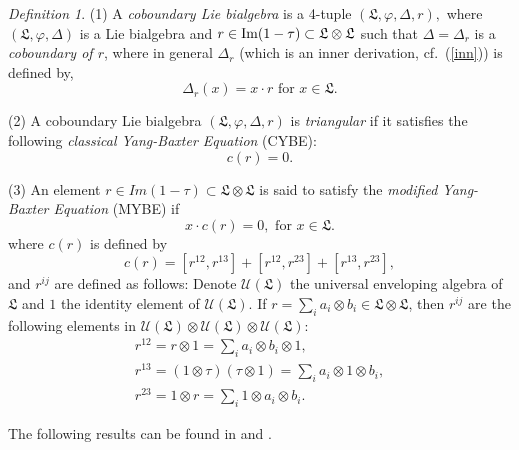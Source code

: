 \documentclass{amsart}
\theoremstyle{definition}
\theoremstyle{remark}
\numberwithin{equation}{subsection}
\numberwithin{equation}{section}
\newtheorem{defi}[theo]{Definition}
\begin{document}
\begin{defi}
\label{def2} \rm (1) A {\it coboundary Lie bialgebra} is a 4-tuple
$(\mathfrak{L} , {\varphi}, {\Delta},r),$ where $(\mathfrak{L}, {\varphi}, {\Delta})$ is a Lie
bialgebra and $r \in {{\rm Im}}(1 - \tau) \subset \mathfrak{L}  \otimes
\mathfrak{L} $ such that ${\Delta}={\Delta}_r$ is a {\it coboundary of $r$},
where in general ${\Delta}_r$ (which is an inner derivation,
cf.~(\ref{inn})) is defined by,
\begin{equation}
\label{D-r} {\Delta}_r (x) = x \cdot r \mbox{ \ \ for \ \ }x \in
\mathfrak{L}.
\end{equation}

(2) A coboundary Lie bialgebra $(\mathfrak{L} , {\varphi},{\Delta}, r)$ is {\it
triangular} if it satisfies the following {\it classical Yang-Baxter
Equation} (CYBE):
\begin{equation}
\label{CYBE} c(r)=0.
\end{equation}

(3) An element $r \in Im(1-\tau)
\subset\mathfrak{L}\otimes\mathfrak{L}$ is said to satisfy the {\it
modified Yang-Baxter Equation} (MYBE) if
\begin{equation}
\label{MYBE} x\cdot{c(r)}=0, \mbox{ \ \ for \ \ }x \in \mathfrak{L}.
\end{equation}
where $c(r)$ is defined by
\begin{equation}
\label{add1-} \mbox{$c(r) = [r^{12} , r^{13}] +[r^{12} , r^{23}]
+[r^{13} , r^{23}],$}
\end{equation}
and $r^{ij}$ are defined as follows: Denote ${{\mathcal U}}(\mathfrak{L})$ the
universal enveloping algebra of $\mathfrak{L}$ and $1$ the identity
element of ${{\mathcal U}} (\mathfrak{L})$. If $r =\sum_{i} {a_{i} \otimes
b_{i}} \in \mathfrak{L} \otimes \mathfrak{L} $, then $r^{ij}$ are
the following elements in ${{\mathcal U}} (\mathfrak{L}) \otimes {{\mathcal U}}
(\mathfrak{L} ) \otimes {{\mathcal U}}(\mathfrak{L} )$:
$$\begin{array}{l}
 r^{12} = r\otimes 1=\sum \limits_{i}{a_{i} \otimes b_{i}
\otimes 1,} \\[12pt]
r^{13}= (1\otimes \tau)(\tau\otimes 1)=\sum \limits_{i} {a_{i}
\otimes 1 \otimes b_{i}}, \\[12pt]
r^{23} =1\otimes r= \sum \limits_{i}{1 \otimes a_{i} \otimes b_{i}}.
\end{array}$$
\end{defi}

The following results can be found in {\cite {D2}} and {\cite {NT}}.
\end{document}
